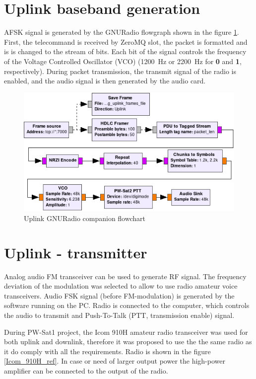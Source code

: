 \section{Uplink baseband generation}
AFSK signal is generated by the GNURadio flowgraph shown in the figure \ref{uplink_flowgraph}. First, the telecommand is received by ZeroMQ slot, the packet is formatted and is is changed to the stream of bits. Each bit of the signal controls the frequency of the Voltage Controlled Oscillator (VCO) (\SI{1200}{\hertz} or \SI{2200}{\hertz} for \textbf{0} and \textbf{1}, respectively). During packet transmission, the transmit signal of the radio is enabled, and the audio signal is then generated by the audio card.

\begin{figure}
    \centering
    \includegraphics[width=0.8\paperwidth]{img/7/uplink_flowgraph.png}
    \caption{Uplink GNURadio companion flowchart}
    \label{uplink_flowgraph}
\end{figure}


\section{Uplink - transmitter}
Analog audio FM transceiver can be used to generate RF signal. The frequency deviation of the modulation was selected to allow to use radio amateur voice transceivers. Audio FSK signal (before FM-modulation) is generated by the software running on the PC. Radio is connected to the computer, which controls the audio to transmit and Push-To-Talk (PTT, transmission enable) signal.

During PW-Sat1 project, the Icom 910H amateur radio transceiver was used for both uplink and downlink, therefore it was proposed to use the the same radio as it do comply with all the requirements. Radio is shown in the figure \ref{Icom_910H_ref}. In case or need of larger output power the high-power amplifier can be connected to the output of the radio.

